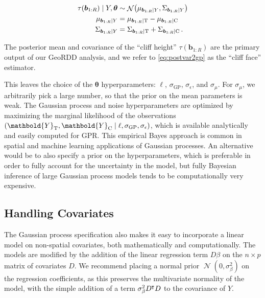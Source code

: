 \documentclass[letter]{article}
\DeclarePairedDelimiter{\parenthesis}{\lparen}{\rparen}
\newcommand{\del}[1]{\parenthesis*{#1}}
\let\Pr\relax
\DeclareMathOperator{\Pr}{\mathbb{P}}
\DeclareMathOperator{\normal}{\mathcal{N}}
\newcommand*{\trans}{^{\mkern-1.5mu\intercal}}
\newcommand{\treat}{\mathrm{T}}
\newcommand{\ctrol}{\mathrm{C}}
\newcommand{\sigmaf}{\sigma_{\mathrm{GP}}}
\newcommand{\sigman}{\sigma_{\epsilon}}
\newcommand{\sigmabeta}{\sigma_{\beta}}
\newcommand{\sigmamu}{\sigma_{\mu}}
\newcommand{\Yvec}{\mathbold{Y}}
\newcommand{\yt}{\Yvec_{\treat}}
\newcommand{\yc}{\Yvec_{\ctrol}}
\newcommand{\sentinel}{\bm{b}}
\newcommand{\numsent}{R}
\newcommand{\sentinels}{\sentinel_{1:\numsent}}
\newcommand{\eqlabel}[1]{\label{#1}}
\newcommand{\hyperparam}{\bm{\theta}}
\begin{document}
\begin{equation}
\begin{split}
    \tau(\sentinels) \mid Y, \hyperparam &\sim \normal\del{\mu_{\sentinels \mid Y}, \Sigma_{\sentinels \mid Y}}\\
    \mu_{\sentinels \mid Y} &= \mu_{\sentinels \mid \treat} - \mu_{\sentinels \mid \ctrol} \\
    \Sigma_{\sentinels \mid Y} &= \Sigma_{\sentinels \mid \treat} + \Sigma_{\sentinels \mid \ctrol}\,.
\end{split}
\eqlabel{eq:postvar2gp}
\end{equation}

The posterior mean and covariance of the ``cliff height'' \(\tau(\sentinels)\) are the primary output of our GeoRDD analysis, and we refer to \eqref{eq:postvar2gp} as the ``cliff face'' estimator.
    


    	This leaves the choice of the \(\hyperparam\) hyperparameters: \(\ell\), \(\sigmaf\), \(\sigman\), and \(\sigmamu\).
For \(\sigmamu\), we arbitrarily pick a large number, so that the prior on the mean parameters is weak.
The Gaussian process and noise hyperparameters are optimized by maximizing the marginal likelihood of the observations \(\Pr\del{\yt, \yc \mid \ell, \sigmaf, \sigman}\), which is available analytically and easily computed for GPR.
This empirical Bayes approach is common in spatial and machine learning applications of Gaussian processes.
An alternative would be to also specify a prior on the hyperparameters, which is preferable in order to fully account for the uncertainty in the model, but fully Bayesian inference of large Gaussian process models tends to be computationally very expensive.
    


    	\subsection{Handling Covariates}\label{handling-covariates}

The Gaussian process specification also makes it easy to incorporate a linear model on non-spatial covariates, both mathematically and computationally.
The models are modified by the addition of the linear regression term \(D \beta\) on the \(n \times p\) matrix of covariates \(D\). We recommend placing a normal prior \(\normal(0,\sigmabeta^2)\) on the regression coefficients, as this preserves the multivariate normality of the model, with the simple addition of a term \(\sigmabeta^2 D\trans D\) to the covariance of \(Y\).
\end{document}
